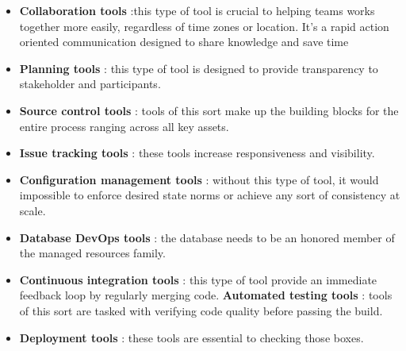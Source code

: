 \begin{itemize}
    \item \textbf{Collaboration tools} :this type of tool is crucial to helping teams works together more easily, regardless of time zones or location. It's a rapid action oriented communication designed to share knowledge and save time
    \item \textbf{Planning tools} : this type of tool is designed to provide transparency to stakeholder and participants.
    \item \textbf{Source control tools} : tools of this sort make up the building blocks for the entire process ranging across all key assets.
    \item \textbf{Issue tracking tools} : these tools increase responsiveness and visibility.
    \item \textbf{Configuration management tools} : without this type of tool, it would impossible to enforce desired state norms or achieve any sort of consistency at scale.
    \item \textbf{Database DevOps tools} : the database needs to be an honored member of the managed resources family.
    \item \textbf{Continuous integration tools} : this type of tool provide an immediate feedback loop by regularly merging code.
          \textbf{Automated testing tools} :  tools of this sort are tasked with verifying code quality before passing the build.
    \item \textbf{Deployment tools} : these tools are essential to checking those boxes.
\end{itemize}